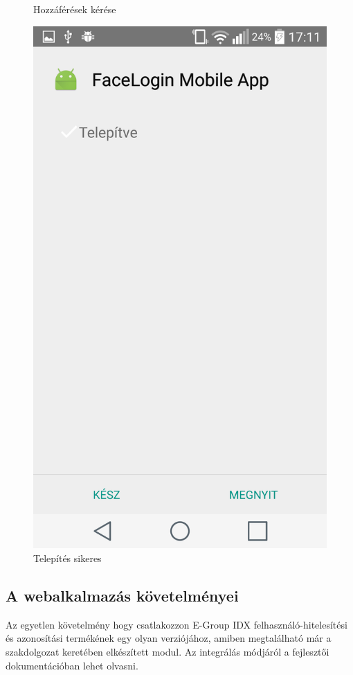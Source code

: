 \begin{figure}[h]
\begin{minipage}{.5\textwidth}
    \caption{Hozzáférések kérése}
 \end{minipage}
 \begin{minipage}{.5\textwidth} 
\centering
     \includegraphics[scale=0.10]{img/app_installed}
     \caption{Telepítés sikeres}
 \end{minipage}
\end{figure}

\subsection{A webalkalmazás követelményei}
Az egyetlen követelmény hogy csatlakozzon  E-Group IDX felhasználó-hitelesítési és azonosítási termékének egy olyan verziójához, amiben megtalálható már a szakdolgozat keretében elkészített modul. Az integrálás módjáról a fejlesztői dokumentációban lehet olvasni.

